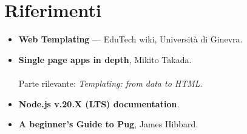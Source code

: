 \section{Riferimenti}

\begin{itemize}
  \item \textbf{Web Templating} --- EduTech wiki, Università di Ginevra. \\
  \item \textbf{Single page apps in depth}, Mikito Takada. \\
         \\
        Parte rilevante: \textit{Templating: from data to HTML}.
  \item \textbf{Node.js v.20.X (LTS) documentation}. \\
  \item \textbf{A beginner's Guide to Pug}, James Hibbard. \\
\end{itemize}
